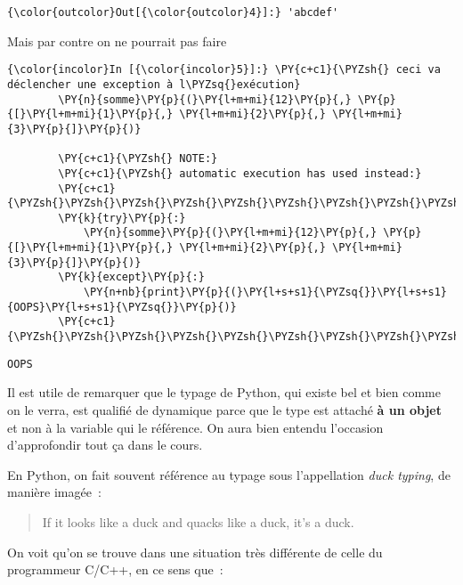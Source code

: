 \begin{Verbatim}[commandchars=\\\{\}]
{\color{outcolor}Out[{\color{outcolor}4}]:} 'abcdef'
\end{Verbatim}
            
    Mais par contre on ne pourrait pas faire

    \begin{Verbatim}[commandchars=\\\{\}]
{\color{incolor}In [{\color{incolor}5}]:} \PY{c+c1}{\PYZsh{} ceci va déclencher une exception à l\PYZsq{}exécution}
        \PY{n}{somme}\PY{p}{(}\PY{l+m+mi}{12}\PY{p}{,} \PY{p}{[}\PY{l+m+mi}{1}\PY{p}{,} \PY{l+m+mi}{2}\PY{p}{,} \PY{l+m+mi}{3}\PY{p}{]}\PY{p}{)}
        
        \PY{c+c1}{\PYZsh{} NOTE:}
        \PY{c+c1}{\PYZsh{} automatic execution has used instead:}
        \PY{c+c1}{\PYZsh{}\PYZsh{}\PYZsh{}\PYZsh{}\PYZsh{}\PYZsh{}\PYZsh{}\PYZsh{}\PYZsh{}\PYZsh{}}
        \PY{k}{try}\PY{p}{:}
            \PY{n}{somme}\PY{p}{(}\PY{l+m+mi}{12}\PY{p}{,} \PY{p}{[}\PY{l+m+mi}{1}\PY{p}{,} \PY{l+m+mi}{2}\PY{p}{,} \PY{l+m+mi}{3}\PY{p}{]}\PY{p}{)}
        \PY{k}{except}\PY{p}{:}
            \PY{n+nb}{print}\PY{p}{(}\PY{l+s+s1}{\PYZsq{}}\PY{l+s+s1}{OOPS}\PY{l+s+s1}{\PYZsq{}}\PY{p}{)}
        \PY{c+c1}{\PYZsh{}\PYZsh{}\PYZsh{}\PYZsh{}\PYZsh{}\PYZsh{}\PYZsh{}\PYZsh{}\PYZsh{}\PYZsh{}}
\end{Verbatim}


    \begin{Verbatim}[commandchars=\\\{\}]
OOPS

    \end{Verbatim}

    Il est utile de remarquer que le typage de Python, qui existe bel et
bien comme on le verra, est qualifié de dynamique parce que le type est
attaché \textbf{à un objet} et non à la variable qui le référence. On
aura bien entendu l'occasion d'approfondir tout ça dans le cours.

    En Python, on fait souvent référence au typage sous l'appellation
\emph{duck typing}, de manière imagée~:

\begin{quote}
If it looks like a duck and quacks like a duck, it's a duck.
\end{quote}

    On voit qu'on se trouve dans une situation très différente de celle du
programmeur C/C++, en ce sens que~:

